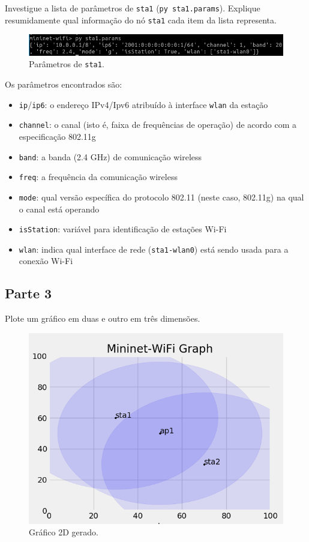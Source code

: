 \documentclass{article}
\begin{document}
\FloatBarrier

\begin{tcolorbox}
    Investigue a lista de parâmetros de \texttt{sta1} (\texttt{py sta1.params}).
    Explique resumidamente qual informação do nó \texttt{sta1} cada item da lista representa.
\end{tcolorbox}

\begin{figure}[!htb]
\centering
\includegraphics[width=\columnwidth]{images/p2_params.png}
\caption{Parâmetros de \texttt{sta1}.}
\end{figure}

Os parâmetros encontrados são:

\begin{itemize}
    \item \texttt{ip}/\texttt{ip6}: o endereço IPv4/Ipv6 atribuído à interface \texttt{wlan}
          da estação
    \item \texttt{channel}: o canal (isto é, faixa de frequências de operação) de
          acordo com a especificação 802.11g
    \item \texttt{band}: a banda (2.4 GHz) de comunicação wireless
    \item \texttt{freq}: a frequência da comunicação wireless
    \item \texttt{mode}: qual versão específica do protocolo 802.11 (neste caso,
          802.11g) na qual o canal está operando
    \item \texttt{isStation}: variável para identificação de estações Wi-Fi
    \item \texttt{wlan}: indica qual interface de rede (\texttt{sta1-wlan0}) está
          sendo usada para a conexão Wi-Fi


\end{itemize}

\subsection{Parte 3}

\begin{tcolorbox}
    Plote um gráfico em duas e outro em três dimensões.
\end{tcolorbox}

\begin{figure}[!htb]
\centering
\includegraphics[width=0.6\columnwidth]{images/p3_2d.png}
\caption{Gráfico 2D gerado.}
\end{figure}
\end{document}
